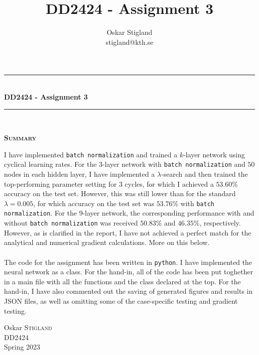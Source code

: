 \documentclass{article}
\title{DD2424 - Assignment 3}
\author{Oskar Stigland \\ stigland@kth.se}
\begin{document}

	\begin{titlepage}
		\begin{center} 
			
			\rule{\linewidth}{0.5mm}\\[0.5 cm]
			{ \huge \bfseries DD2424 - Assignment 3}\\[0.3 cm] %
			\rule{\linewidth}{0.5mm}\\[1 cm]
					
			\small\vfill
			\begin{center}
			\centering
			{\large \bfseries \textsc{Summary}}\\
			\vspace{1cm}
			\begin{minipage}{10cm}
				
				I have implemented \texttt{batch normalization} and trained a $k$-layer network using cyclical learning rates. For the $3$-layer network with \texttt{batch normalization} and $50$ nodes in each hidden layer, I have implemented a $\lambda$-search and then trained the top-performing parameter setting for $3$ cycles, for which I achieved a $53.60$\% accuracy on the test set. However, this was still lower than for the standard $\lambda = 0.005$, for which accuracy on the test set was $53.76$\% with \texttt{batch normalization}. For the $9$-layer network, the corresponding performance with and without \texttt{batch normalization} was received $50.83$\% and $46.35$\%, respectively. However, as is clarified in the report, I have not achieved a perfect match for the analytical and numerical gradient calculations. More on this below.\\\\
%
	The code for the assignment has been written in \texttt{python}. I have implemented the neural network as a class. For the hand-in, all of the code has been put toghether in a main file with all the functions and the class declared at the top. For the hand-in, I have also commented out the saving of generated figures and results in JSON files, as well as omitting some of the case-specific testing and gradient testing.
			\end{minipage}
			\end{center}
			\large\vfill
						

		\end{center}	
		
		\begin{minipage}{0.4\textwidth}
			\begin{flushleft} \large
				Oskar \textsc{Stigland}\\
				DD2424\\
				Spring 2023
			\end{flushleft}
		\end{minipage}	

	\end{titlepage}
\end{document}
